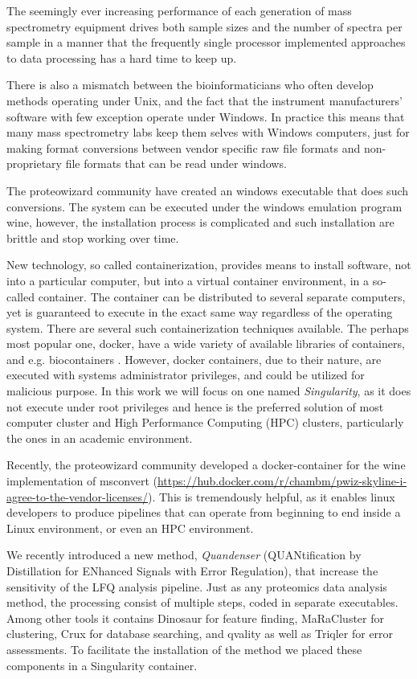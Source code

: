\documentclass[11pt]{article}
\begin{document}
The seemingly ever increasing performance of each generation of mass spectrometry equipment drives both sample sizes and the number of spectra per sample in a manner that the frequently single processor implemented approaches to data processing has a hard time to keep up.

There is also a mismatch between the bioinformaticians who often develop methods operating under Unix, and the fact that the instrument manufacturers' software with few exception operate under Windows. In practice this means that many mass spectrometry labs keep them selves with Windows computers, just for making format conversions between vendor specific raw file formats and non-proprietary file formats that can be read under windows.

The proteowizard community have created an windows executable that does such conversions. The system can be executed under the windows emulation program wine, however, the installation process is complicated and such installation are brittle and stop working over time.

New technology, so called containerization, provides means to install software, not into a particular computer, but into a virtual container environment, in a so-called container. The container can be distributed to several separate computers, yet is guaranteed to execute in the exact same way regardless of the operating system. There are several such containerization techniques available. The perhaps most popular one, docker, have a wide variety of available libraries of containers, and e.g. biocontainers \cite{biocontainers}. However, docker containers, due to their nature, are executed with systems administrator privileges, and could be utilized for malicious purpose.  In this work we will focus on one named \textit{Singularity}, as it does not execute under root privileges and hence is the preferred solution of most computer cluster and High Performance Computing (HPC) clusters, particularly the ones in an academic environment.

Recently, the proteowizard community developed a docker-container for the wine implementation of msconvert (\url{https://hub.docker.com/r/chambm/pwiz-skyline-i-agree-to-the-vendor-licenses/}). This is tremendously helpful, as it enables linux developers to produce pipelines that can operate from beginning to end inside a Linux environment, or even an HPC environment.

We recently introduced a new method, {\em Quandenser} (QUANtification by Distillation for ENhanced Signals with Error Regulation), that increase the sensitivity of the LFQ analysis pipeline. Just as any proteomics data analysis method, the processing consist of multiple steps, coded in separate executables. Among other tools it contains Dinosaur\cite{teleman2016dinosaur} for feature finding, MaRaCluster\cite{the2016maracluster} for clustering, Crux\cite{mcilwain2014} for database searching, and qvality\cite{kall2008non} as well as Triqler\cite{the2018integrated} for error assessments. To facilitate the installation of the method we placed these components in a Singularity container.
\end{document}

